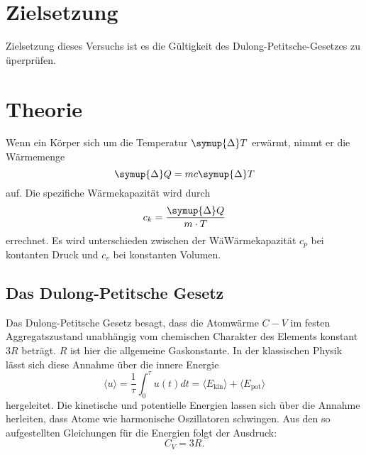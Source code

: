 \section{Zielsetzung}
Zielsetzung dieses Versuchs ist es die Gültigkeit des Dulong-Petitsche-Gesetzes zu üperprüfen.
\section{Theorie}
\label{sec:Theorie}
Wenn ein Körper sich um die Temperatur $\symup{\Delta} T$ erwärmt, nimmt er die Wärmemenge
\begin{equation}
\symup{\Delta} Q = m c \symup{\Delta} T
\end{equation}
auf.
Die spezifiche Wärmekapazität wird durch
\begin{equation}
c_k = \frac{\symup{\Delta} Q}{m \cdot T}
\end{equation}
errechnet.
Es wird unterschieden zwischen der WäWärmekapazität $c_p$ bei kontanten Druck und $c_v$ bei konstanten Volumen.
\subsection{Das Dulong-Petitsche Gesetz}
Das Dulong-Petitsche Gesetz besagt, dass die Atomwärme $C-V$ im festen Aggregatszustand
unabhängig vom chemischen Charakter des Elements konstant $3R$ beträgt.
$R$ ist hier die allgemeine Gaskonstante.
In der klassischen Physik lässt sich diese Annahme über die innere Energie
 \begin{equation}
 \langle u \rangle = \frac{1}{\tau} \int_0^\tau u(t)dt = \langle E_\text{kin} \rangle + \langle
E_\text{pot} \rangle
 \end{equation}
hergeleitet.
Die kinetische und potentielle Energien lassen sich über die Annahme herleiten, dass Atome
wie harmonische Oszillatoren schwingen.
Aus den so aufgestellten Gleichungen für die Energien folgt der Ausdruck:
\begin{equation}
C_V = 3R .
\end{equation}
